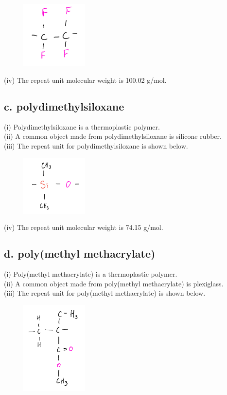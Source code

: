 \documentclass{article}
\begin{document}
\begin{figure}[H]
    \centering
    \includegraphics[width=0.3\textwidth]{ptfe.jpeg}
\end{figure}

(iv) The repeat unit molecular weight is 100.02 g/mol.

\subsection*{c. polydimethylsiloxane}

(i) Polydimethylsiloxane is a thermoplastic polymer. \\
(ii) A common object made from polydimethylsiloxane is silicone rubber. \\
(iii) The repeat unit for polydimethylsiloxane is shown below.

\begin{figure}[H]
    \centering
    \includegraphics[width=0.3\textwidth]{pdms.jpeg}
\end{figure}
\noindent

(iv) The repeat unit molecular weight is 74.15 g/mol.


\subsection*{d. poly(methyl methacrylate)}

(i) Poly(methyl methacrylate) is a thermoplastic polymer. \\
(ii) A common object made from poly(methyl methacrylate) is plexiglass. \\
(iii) The repeat unit for poly(methyl methacrylate) is shown below.

\begin{figure}[H]
    \centering
    \includegraphics[width=0.3\textwidth]{pmma.jpeg}
\end{figure}
\end{document}
